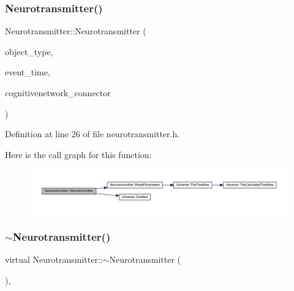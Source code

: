 \subsubsection{\texorpdfstring{Neurotransmitter()}{Neurotransmitter()}\hspace{0.1cm}{\footnotesize\ttfamily [4/4]}}
{\footnotesize\ttfamily Neurotransmitter\+::\+Neurotransmitter (\begin{DoxyParamCaption}\item[{unsigned int}]{object\+\_\+type,  }\item[{std\+::chrono\+::time\+\_\+point$<$ \mbox{\hyperlink{universe_8h_a0ef8d951d1ca5ab3cfaf7ab4c7a6fd80}{Clock}} $>$}]{event\+\_\+time,  }\item[{\mbox{\hyperlink{class_cognitive_network}{Cognitive\+Network}} \&}]{cognitivenetwork\+\_\+connector }\end{DoxyParamCaption})\hspace{0.3cm}{\ttfamily [inline]}}



Definition at line 26 of file neurotransmitter.\+h.

Here is the call graph for this function\+:\nopagebreak
\begin{figure}[H]
\begin{center}
\leavevmode
\includegraphics[width=350pt]{class_neurotransmitter_ac9257a1b310a26eba8a08ffb4b93bb64_cgraph}
\end{center}
\end{figure}
\mbox{\label{class_neurotransmitter_a0ea63f67dc5a49d485b7a7034a8f7968}} 
\subsubsection{\texorpdfstring{$\sim$\+Neurotransmitter()}{~Neurotransmitter()}}
{\footnotesize\ttfamily virtual Neurotransmitter\+::$\sim$\+Neurotransmitter (\begin{DoxyParamCaption}{ }\end{DoxyParamCaption})\hspace{0.3cm}{\ttfamily [inline]}, {\ttfamily [virtual]}}

